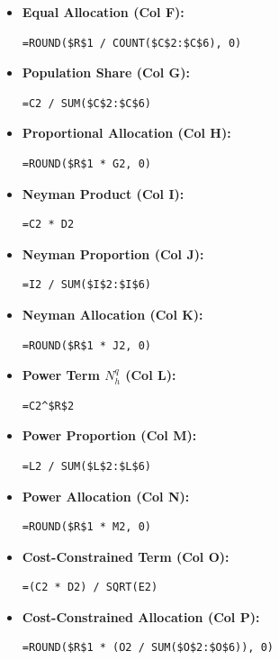 \documentclass[11pt, a4paper]{article}
\begin{document}
\begin{itemize}
    \item \textbf{Equal Allocation (Col F):}
    \begin{verbatim}=ROUND($R$1 / COUNT($C$2:$C$6), 0)\end{verbatim}
    
    \item \textbf{Population Share (Col G):}
    \begin{verbatim}=C2 / SUM($C$2:$C$6)\end{verbatim}
    
    \item \textbf{Proportional Allocation (Col H):}
    \begin{verbatim}=ROUND($R$1 * G2, 0)\end{verbatim}
    
    \item \textbf{Neyman Product (Col I):}
    \begin{verbatim}=C2 * D2\end{verbatim}
    
    \item \textbf{Neyman Proportion (Col J):}
    \begin{verbatim}=I2 / SUM($I$2:$I$6)\end{verbatim}
    
    \item \textbf{Neyman Allocation (Col K):}
    \begin{verbatim}=ROUND($R$1 * J2, 0)\end{verbatim}
    
    \item \textbf{Power Term $N_h^q$ (Col L):}
    \begin{verbatim}=C2^$R$2\end{verbatim}
    
    \item \textbf{Power Proportion (Col M):}
    \begin{verbatim}=L2 / SUM($L$2:$L$6)\end{verbatim}
    
    \item \textbf{Power Allocation (Col N):}
    \begin{verbatim}=ROUND($R$1 * M2, 0)\end{verbatim}
    
    \item \textbf{Cost-Constrained Term (Col O):}
    \begin{verbatim}=(C2 * D2) / SQRT(E2)\end{verbatim}
    
    \item \textbf{Cost-Constrained Allocation (Col P):}
    \begin{verbatim}=ROUND($R$1 * (O2 / SUM($O$2:$O$6)), 0)\end{verbatim}
\end{itemize}
\end{document}

